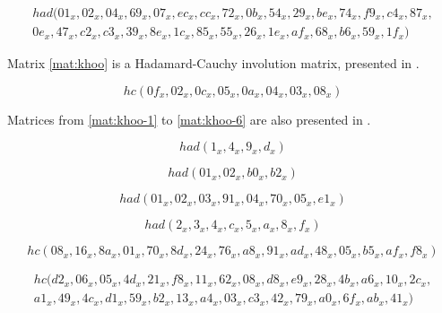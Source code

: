 \begin{align}\label{mat:gupta_ray_5}
had(01_x, 02_x, 04_x, 69_x, 07_x, ec_x, cc_x, 72_x, 0b_x, 54_x, 29_x, be_x, 74_x, f9_x, c4_x, 87_x, \nonumber\\ 0e_x, 47_x, c2_x, c3_x, 39_x, 8e_x, 1c_x, 85_x, 55_x, 26_x, 1e_x, af_x, 68_x, b6_x, 59_x, 1f_x)
\end{align}

Matrix \eqref{mat:khoo} is a Hadamard-Cauchy involution matrix, presented in \cite{LwInvolKhoo2015}.

\begin{equation}\label{mat:khoo}
hc(0f_x, 02_x, 0c_x, 05_x, 0a_x, 04_x, 03_x, 08_x)
\end{equation}


Matrices from \eqref{mat:khoo-1} to \eqref{mat:khoo-6} are also presented in \cite{LwInvolKhoo2015}.

\begin{equation}\label{mat:khoo-1}
had(1_x, 4_x, 9_x, d_x)
\end{equation}

\begin{equation}\label{mat:khoo-2}
had(01_x, 02_x, b0_x, b2_x)
\end{equation}

\begin{equation}\label{mat:khoo-3}
had(01_x, 02_x, 03_x, 91_x, 04_x, 70_x, 05_x, e1_x)
\end{equation}

\begin{equation}\label{mat:khoo-4}
had(2_x, 3_x, 4_x, c_x, 5_x, a_x, 8_x, f_x)
\end{equation}

\begin{equation}\label{mat:khoo-5}
hc(08_x, 16_x, 8a_x, 01_x, 70_x, 8d_x, 24_x, 76_x, a8_x, 91_x, ad_x, 48_x, 05_x, b5_x, af_x , f8_x)
\end{equation}

\begin{align}\label{mat:khoo-6}
hc(d2_x, 06_x, 05_x, 4d_x, 21_x, f8_x, 11_x, 62_x, 08_x, d8_x, e9_x, 28_x, 4b_x, a6_x, 10_x, 2c_x, \nonumber\\ a1_x, 49_x, 4c_x, d1_x, 59_x, b2_x, 13_x, a4_x, 03_x, c3_x, 42_x, 79_x, a0_x, 6f_x, ab_x, 41_x)
\end{align}

